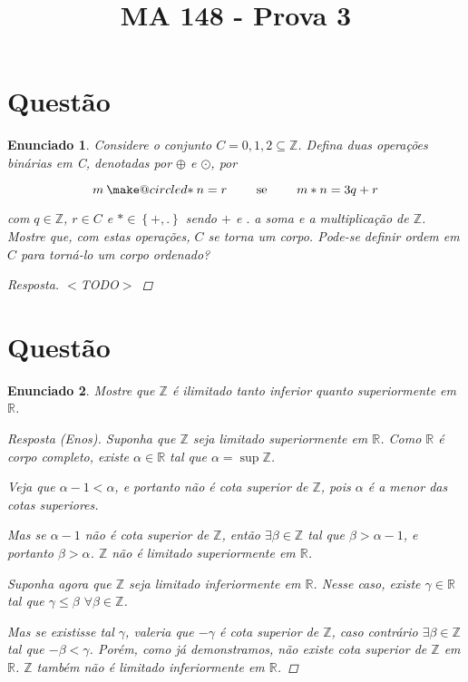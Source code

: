 \documentclass[a4paper,twoside,11pt]{article}
\makeatletter
\newcommand{\oast}{\mathbin{\mathpalette\make@circled\ast}}
\newcommand{\make@circled}[2]{%
  \ooalign{$\m@th#1\smallbigcirc{#1}$\cr\hidewidth$\m@th#1#2$\hidewidth\cr}%
}
\newcommand{\smallbigcirc}[1]{%
  \vcenter{\hbox{\scalebox{0.77778}{$\m@th#1\bigcirc$}}}%
}
\newtheorem*{enunciado}{Enunciado}
\makeatother
\begin{document}
\title{MA 148 - Prova 3}
\author{}
\date{}
\maketitle



\section{Questão}
\begin{enunciado}
    Considere o conjunto $C = {0, 1, 2} \subseteq \mathbb{Z}$.
    Defina duas operações binárias em C, denotadas por $\oplus$ e $\odot$, por

    $$m \oast n = r \qquad \text{ se } \qquad m \ast n = 3q + r$$

    com $q \in \mathbb{Z}$, $r \in C$ e $\ast \in \left\{ +, . \right\}$ sendo
    $+$ e $.$ a soma e a multiplicação de $\mathbb{Z}$. Mostre que, com estas
    operações, $C$ se torna um corpo. Pode-se definir ordem em $C$ para
    torná-lo um corpo ordenado?

    \begin{proof}[Resposta]
        $<$TODO$>$
    \end{proof}
\end{enunciado}



\section{Questão}
\begin{enunciado}
    Mostre que $\mathbb{Z}$ é ilimitado tanto inferior quanto superiormente em
    $\mathbb{R}$.

    \begin{proof}[Resposta (Enos)]
        Suponha que $\mathbb{Z}$ seja limitado superiormente em $\mathbb{R}$.
        Como $\mathbb{R}$ é corpo completo, existe $\alpha \in \mathbb{R}$
        tal que $\alpha = \sup \mathbb{Z}$.

        Veja que $\alpha - 1 < \alpha$, e portanto não é cota superior de
        $\mathbb{Z}$, pois $\alpha$ é a menor das cotas superiores.

        Mas se $\alpha - 1$ não é cota superior de $\mathbb{Z}$, então
        $\exists \beta \in \mathbb{Z}$ tal que $\beta > \alpha - 1$, e portanto
        $\beta > \alpha$. \Lightning \quad $\mathbb{Z}$ não é limitado
        superiormente em $\mathbb{R}$.

        Suponha agora que $\mathbb{Z}$ seja limitado inferiormente em
        $\mathbb{R}$. Nesse caso, existe $\gamma \in \mathbb{R}$ tal que
        $\gamma \leq \beta$ $\forall \beta \in \mathbb{Z}$.

        Mas se existisse tal $\gamma$, valeria que $-\gamma$ é cota superior
        de $\mathbb{Z}$, caso contrário $\exists \beta \in \mathbb{Z}$ tal que
        $-\beta < \gamma$. Porém, como já demonstramos, não existe cota superior
        de $\mathbb{Z}$ em $\mathbb{R}$. \Lightning \quad $\mathbb{Z}$ também 
        não é limitado inferiormente em $\mathbb{R}$.
    \end{proof}
\end{enunciado}
\end{document}
